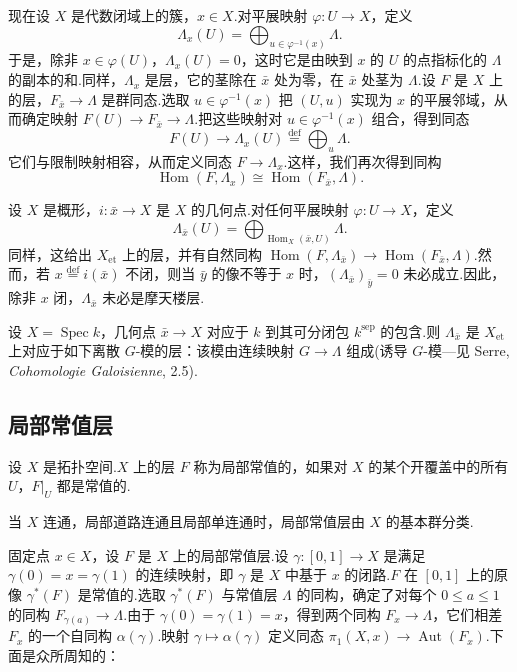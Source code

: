 现在设 $X$ 是代数闭域上的簇，$x \in X$.对平展映射 $\varphi \colon U \to X$，定义
\[
\Lambda_x(U) = \bigoplus_{u \in \varphi^{-1}(x)} \Lambda.
\]
于是，除非 $x \in \varphi(U)$，$\Lambda_x(U) = 0$，这时它是由映到 $x$ 的 $U$ 的点指标化的 $\Lambda$ 的副本的和.同样，$\Lambda_x$ 是层，它的茎除在 $\bar{x}$ 处为零，在 $\bar{x}$ 处茎为 $\Lambda$.设 $F$ 是 $X$ 上的层，$F_{\bar{x}} \to \Lambda$ 是群同态.选取 $u \in \varphi^{-1}(x)$ 把 $(U, u)$ 实现为 $x$ 的平展邻域，从而确定映射 $F(U) \to F_{\bar{x}} \to \Lambda$.把这些映射对 $u \in \varphi^{-1}(x)$ 组合，得到同态
\[
F(U) \to \Lambda_x(U) \overset{\mathrm{def}}{=} \bigoplus_{u} \Lambda.
\]
它们与限制映射相容，从而定义同态 $F \to \Lambda_x$.这样，我们再次得到同构
\[
\operatorname{Hom}(F, \Lambda_x) \cong \operatorname{Hom}(F_{\bar{x}}, \Lambda).
\]

设 $X$ 是概形，$i \colon \bar{x} \to X$ 是 $X$ 的几何点.对任何平展映射 $\varphi \colon U \to X$，定义
\[
\Lambda_{\bar{x}}(U) = \bigoplus_{\operatorname{Hom}_X(\bar{x}, U)} \Lambda.
\]
同样，这给出 $X_{\mathrm{et}}$ 上的层，并有自然同构 $\operatorname{Hom}(F, \Lambda_{\bar{x}}) \to \operatorname{Hom}(F_{\bar{x}}, \Lambda)$.然而，若 $x \overset{\mathrm{def}}{=} i(\bar{x})$ 不闭，则当 $\bar{y}$ 的像不等于 $x$ 时，$(\Lambda_{\bar{x}})_{\bar{y}} = 0$ 未必成立.因此，除非 $x$ 闭，$\Lambda_{\bar{x}}$ 未必是摩天楼层.

\begin{example}\label{ex:6.14}
设 $X = \operatorname{Spec} k$，几何点 $\bar{x} \to X$ 对应于 $k$ 到其可分闭包 $k^{\mathrm{sep}}$ 的包含.则 $\Lambda_{\bar{x}}$ 是 $X_{\mathrm{et}}$ 上对应于如下离散 $G$-模的层：该模由连续映射 $G \to \Lambda$ 组成(诱导 $G$-模---见 Serre, \emph{Cohomologie Galoisienne}, 2.5).
\end{example}

\subsection*{局部常值层}

设 $X$ 是拓扑空间.$X$ 上的层 $F$ 称为局部常值的，如果对 $X$ 的某个开覆盖中的所有 $U$，$F|_{U}$ 都是常值的.

当 $X$ 连通，局部道路连通且局部单连通时，局部常值层由 $X$ 的基本群分类.

固定点 $x \in X$，设 $F$ 是 $X$ 上的局部常值层.设 $\gamma \colon [0, 1] \to X$ 是满足 $\gamma(0) = x = \gamma(1)$ 的连续映射，即 $\gamma$ 是 $X$ 中基于 $x$ 的闭路.$F$ 在 $[0, 1]$ 上的原像 $\gamma^{*}(F)$ 是常值的.选取 $\gamma^{*}(F)$ 与常值层 $\Lambda$ 的同构，确定了对每个 $0 \leq a \leq 1$ 的同构 $F_{\gamma(a)} \to \Lambda$.由于 $\gamma(0) = \gamma(1) = x$，得到两个同构 $F_x \to \Lambda$，它们相差 $F_x$ 的一个自同构 $\alpha(\gamma)$.映射 $\gamma \mapsto \alpha(\gamma)$ 定义同态 $\pi_1(X, x) \to \operatorname{Aut}(F_x)$.下面是众所周知的：

